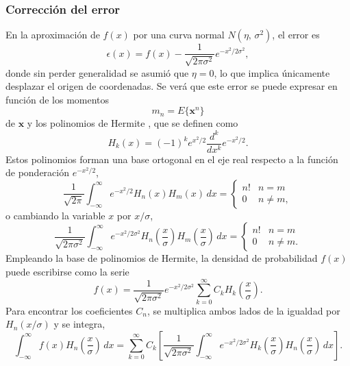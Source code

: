 \documentclass[a4paper]{report}
\newcommand{\x}{\mathbf{x}}
\begin{document}
\subsubsection{Corrección del error}

En la aproximación de \(f(x)\) por una curva normal \(N(\eta,\,\sigma^2)\), el error es
\begin{equation}\label{eq:hermite_error_correction}
 \epsilon(x)=f(x)-\frac{1}{\sqrt{2\pi\sigma^2}}e^{-x^2/2\sigma^2},
\end{equation}
donde sin perder generalidad se asumió que \(\eta=0\), lo que implica únicamente desplazar el origen de coordenadas. Se verá que este error se puede expresar en función de los momentos
\[
 m_n=E\{\x^n\}
\]
de \(\x\) y los polinomios de Hermite \cite{singer2006moment}, que se definen como
\begin{equation}\label{eq:hermite_polinomials}
 H_k(x)=(-1)^ke^{x^2/2}\frac{d^k}{dx^k}e^{-x^2/2}. 
\end{equation}
Estos polinomios forman una base ortogonal en el eje real respecto a la función de ponderación \(e^{-x^2/2}\),
\[
 \frac{1}{\sqrt{2\pi}}\int_{-\infty}^{\infty}e^{-x^2/2}H_n(x)H_m(x)\,dx=
 \left\{\begin{array}{ll}
  n! & n=m \\
  0 & n\neq m,
 \end{array} \right.
\]
o cambiando la variable \(x\) por \(x/\sigma\),
\begin{equation}\label{eq:hermite_orthogonality}
 \frac{1}{\sqrt{2\pi\sigma^2}}\int_{-\infty}^{\infty}e^{-x^2/2\sigma^2}H_n\left(\frac{x}{\sigma}\right)H_m\left(\frac{x}{\sigma}\right)\,dx=
 \left\{\begin{array}{ll}
  n! & n=m \\
  0 & n\neq m.
 \end{array} \right. 
\end{equation}
Empleando la base de polinomios de Hermite, la densidad de probabilidad \(f(x)\) puede escribirse como la serie
\begin{equation}\label{eq:hermite_density_expansion}
 f(x)=\frac{1}{\sqrt{2\pi\sigma^2}}e^{-x^2/2\sigma^2}\sum_{k=0}^\infty C_kH_k\left(\frac{x}{\sigma}\right).
\end{equation}
Para encontrar los coeficientes \(C_n\), se multiplica ambos lados de la igualdad por \(H_n(x/\sigma)\) y se integra,
\[
 \int_{-\infty}^\infty f(x)H_n\left(\frac{x}{\sigma}\right)\,dx=\sum_{k=0}^\infty C_k\left[\frac{1}{\sqrt{2\pi\sigma^2}}\int_{-\infty}^\infty e^{-x^2/2\sigma^2}H_k\left(\frac{x}{\sigma}\right)H_n\left(\frac{x}{\sigma}\right)\,dx\right].
\]
\end{document}
